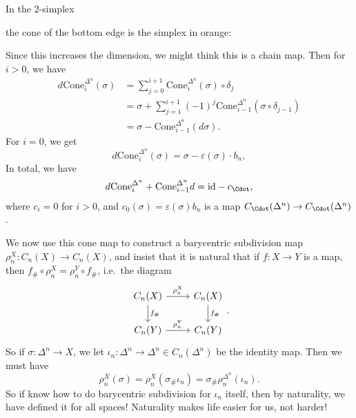 \documentclass[a4paper]{article}
\theoremstyle{definition}
\begin{document}
\begin{eg}
  In the $2$-simplex
  \begin{center}
  \end{center}
  the cone of the bottom edge is the simplex in orange:
  \begin{center}
  \end{center}

\end{eg}
Since this increases the dimension, we might think this is a chain map. Then for $i > 0$, we have
\begin{align*}
  d \mathrm{Cone}_i^{\Delta^n}(\sigma) &= \sum_{j = 0}^{i + 1} \mathrm{Cone}_i^{\Delta^n}(\sigma) \circ \delta_j \\
  &= \sigma + \sum_{j = 1}^{i + 1} (-1)^j \mathrm{Cone}_{i - 1}^{\Delta^n} (\sigma \circ \delta_{j - 1})\\
  &= \sigma - \mathrm{Cone}_{i - 1}^{\Delta^n} (d \sigma).
\end{align*}
For $i = 0$, we get
\[
  d \mathrm{Cone}_i^{\Delta^n}(\sigma) = \sigma - \varepsilon(\sigma) \cdot b_n,
\]
In total, we have
\[
  d \mathrm{Cone}_i^{\Delta^n} + \mathrm{Cone}_{i - 1}^{\Delta^n} d = \mathrm{id} - c_{\Cdot},
\]
where $c_i = 0$ for $i > 0$, and $c_0(\sigma) = \varepsilon(\sigma) b_n$ is a map $C_\Cdot(\Delta^n) \to C_\Cdot(\Delta^n)$.

We now use this cone map to construct a barycentric subdivision map $\rho_n^X: C_n(X) \to C_n(X)$, and insist that it is natural that if $f: X \to Y$ is a map, then $f_\# \circ \rho_n^X = \rho_n^Y \circ f_\#$, i.e.\ the diagram
\[
  \begin{tikzcd}
    C_n(X) \ar[r, "\rho_n^X"] \ar[d, "f_\#"] & C_n(X) \ar[d, "f_\#"]\\
    C_n(Y) \ar[r, "\rho_n^Y"] & C_n(Y)
  \end{tikzcd}.
\]
So if $\sigma: \Delta^n \to X$, we let $\iota_n: \Delta^n \to \Delta^n \in C_n(\Delta^n)$ be the identity map. Then we must have
\[
  \rho_n^X (\sigma) = \rho_n^X (\sigma_\# \iota_n) = \sigma_\# \rho_n^{\Delta^n}(\iota_n).
\]
So if know how to do barycentric subdivision for $\iota_n$ itself, then by naturality, we have defined it for all spaces! Naturality makes life easier for us, not harder!
\end{document}
